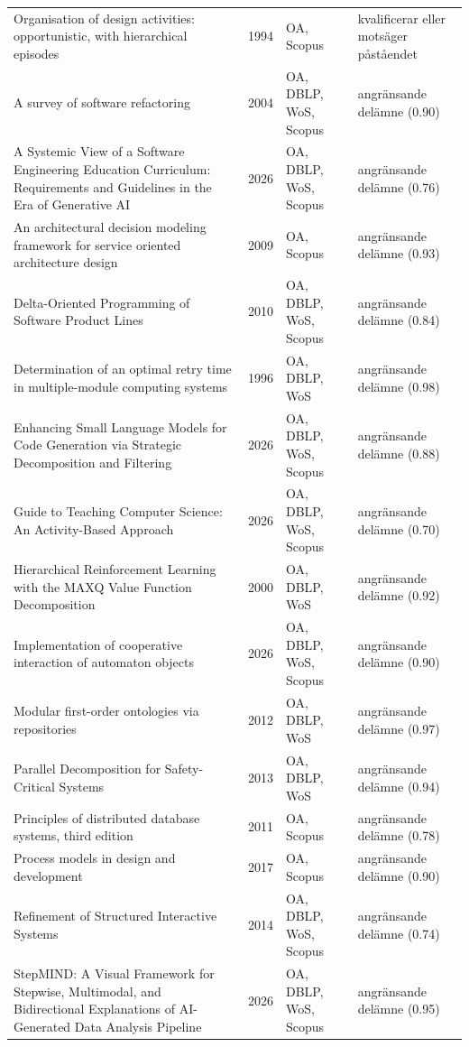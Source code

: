 \begin{longtable}{@{}%
  >{\raggedright\arraybackslash}p{}c%
  >{\raggedright\arraybackslash}p{}%
  >{\raggedright\arraybackslash}p{}@{}}
Organisation of design activities: opportunistic, with hierarchical episodes & 1994 & OA, Scopus & kvalificerar eller motsäger påståendet \\
A survey of software refactoring & 2004 & OA, DBLP, WoS, Scopus & angränsande delämne (0.90) \\
A Systemic View of a Software Engineering Education Curriculum: Requirements and Guidelines in the Era of Generative AI & 2026 & OA, DBLP, WoS, Scopus & angränsande delämne (0.76) \\
An architectural decision modeling framework for service oriented architecture design & 2009 & OA, Scopus & angränsande delämne (0.93) \\
Delta-Oriented Programming of Software Product Lines & 2010 & OA, DBLP, WoS, Scopus & angränsande delämne (0.84) \\
Determination of an optimal retry time in multiple-module computing systems & 1996 & OA, DBLP, WoS & angränsande delämne (0.98) \\
Enhancing Small Language Models for Code Generation via Strategic Decomposition and Filtering & 2026 & OA, DBLP, WoS, Scopus & angränsande delämne (0.88) \\
Guide to Teaching Computer Science: An Activity-Based Approach & 2026 & OA, DBLP, WoS, Scopus & angränsande delämne (0.70) \\
Hierarchical Reinforcement Learning with the MAXQ Value Function Decomposition & 2000 & OA, DBLP, WoS & angränsande delämne (0.92) \\
Implementation of cooperative interaction of automaton objects & 2026 & OA, DBLP, WoS, Scopus & angränsande delämne (0.90) \\
Modular first-order ontologies via repositories & 2012 & OA, DBLP, WoS & angränsande delämne (0.97) \\
Parallel Decomposition for Safety-Critical Systems & 2013 & OA, DBLP, WoS & angränsande delämne (0.94) \\
Principles of distributed database systems, third edition & 2011 & OA, Scopus & angränsande delämne (0.78) \\
Process models in design and development & 2017 & OA, Scopus & angränsande delämne (0.90) \\
Refinement of Structured Interactive Systems & 2014 & OA, DBLP, WoS, Scopus & angränsande delämne (0.74) \\
StepMIND: A Visual Framework for Stepwise, Multimodal, and Bidirectional Explanations of AI-Generated Data Analysis Pipeline & 2026 & OA, DBLP, WoS, Scopus & angränsande delämne (0.95) \\

\end{longtable}
